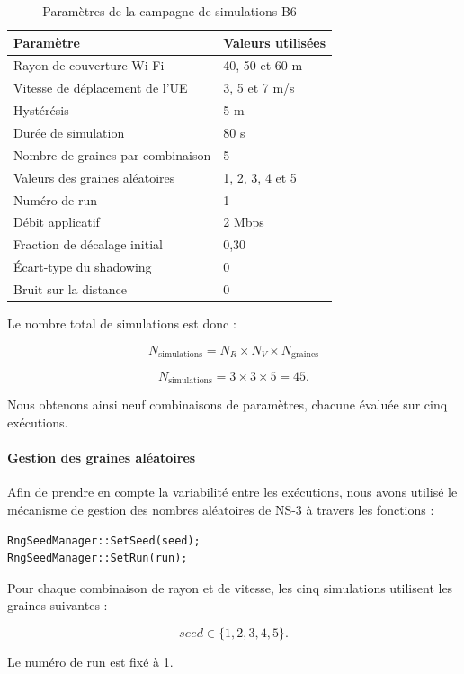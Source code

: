 \begin{table}[H]
\centering
\caption{Paramètres de la campagne de simulations B6}
\label{tab:B6_parameters}
\begin{tabular}{ll}
\toprule
\textbf{Paramètre} & \textbf{Valeurs utilisées}\\
\midrule
Rayon de couverture Wi-Fi & 40, 50 et 60 m\\
Vitesse de déplacement de l'UE & 3, 5 et 7 m/s\\
Hystérésis & 5 m\\
Durée de simulation & 80 s\\
Nombre de graines par combinaison & 5\\
Valeurs des graines aléatoires & 1, 2, 3, 4 et 5\\
Numéro de run & 1\\
Débit applicatif & 2 Mbps\\
Fraction de décalage initial & 0,30\\
Écart-type du shadowing & 0\\
Bruit sur la distance & 0\\
\bottomrule
\end{tabular}
\end{table}

Le nombre total de simulations est donc :

\[
N_{\mathrm{simulations}}
=
N_R \times N_V \times N_{\mathrm{graines}}
\]

\[
N_{\mathrm{simulations}}
=
3 \times 3 \times 5
=
45.
\]

Nous obtenons ainsi neuf combinaisons de paramètres,
chacune évaluée sur cinq exécutions.

\paragraph{Gestion des graines aléatoires}

Afin de prendre en compte la variabilité entre les exécutions,
nous avons utilisé le mécanisme de gestion des nombres aléatoires
de NS-3 à travers les fonctions :

\begin{verbatim}
RngSeedManager::SetSeed(seed);
RngSeedManager::SetRun(run);
\end{verbatim}

Pour chaque combinaison de rayon et de vitesse, les cinq
simulations utilisent les graines suivantes :

\[
seed \in \{1,2,3,4,5\}.
\]

Le numéro de run est fixé à 1.

